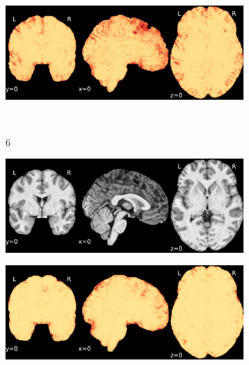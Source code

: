 \documentclass{article}
\begin{document}
\begin{appendices}
\begin{landscape}
\begin{figure}
\begin{subfigure}[t]{0.2\paperheight}
            \end{subfigure}
            \begin{subfigure}[t]{0.2\paperheight}
                \centering
                \includegraphics[width=\textwidth]{figures/sig/0mm/rr.rs_ds001748_sub-adult15_sig.pdf}
            \end{subfigure} \\
            \begin{subfigure}[b][][c]{0.01\paperwidth} 6 \vspace*{15pt} \end{subfigure}
            \begin{subfigure}[t]{0.2\paperheight}
                \centering
                \includegraphics[width=\textwidth]{figures/sig/0mm/ieee_ds001748_sub-adult16.pdf}
            \end{subfigure}
            \begin{subfigure}[t]{0.2\paperheight}
                \centering
                \includegraphics[width=\textwidth]{figures/sig/0mm/rr_ds001748_sub-adult16_sig.pdf}

\end{subfigure}
\end{figure}
\end{landscape}
\end{appendices}
\end{document}
